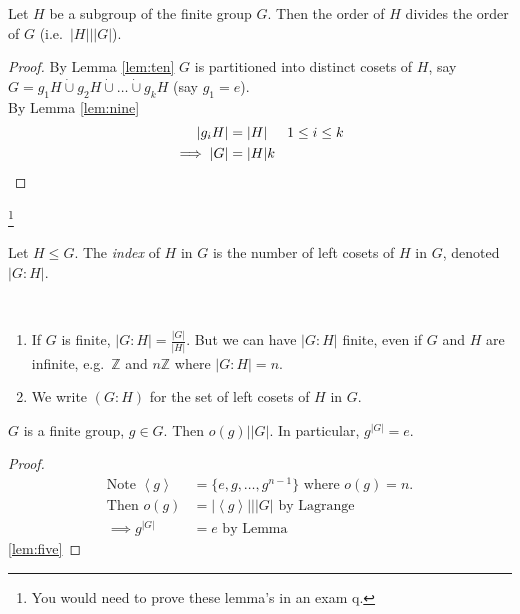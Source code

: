 \begin{theorem}
\protect\hypertarget{thm:three}{}\label{thm:three}Let \(H\) be a subgroup of the finite group \(G\).
Then the order of \(H\) divides the order of \(G\) (i.e.~\(|H| \bigg| |G|\)).
\end{theorem}

\begin{proof}
By Lemma \ref{lem:ten} \(G\) is partitioned into distinct cosets of \(H\), say \(G = g_1 H \dot{\cup} g_2 H \dot{\cup} \ldots \dot{\cup} g_k H\) (say \(g_1 = e\)).\\
By Lemma \ref{lem:nine}
\begin{align*}
    |g_i H| &= |H| \hspace{.5cm} 1 \leq i \leq k \\
    \implies |G| &= |H|k
\end{align*}
\end{proof}

\footnote{You would need to prove these lemma's in an exam q.}

\begin{definition}
\protect\hypertarget{def:fourteen}{}\label{def:fourteen}Let \(H \leq G\).
The \emph{index} of \(H\) in \(G\) is the number of left cosets of \(H\) in \(G\), denoted \(|G : H|\).
\end{definition}

\begin{remark}

~

\begin{enumerate}
\def\labelenumi{\roman{enumi}.}
\item
  If \(G\) is finite, \(|G : H| = \frac{|G|}{|H|}\).
  But we can have \(|G : H|\) finite, even if \(G\) and \(H\) are infinite, e.g.~\(\mathbb{Z}\) and \(n\mathbb{Z}\) where \(|G : H| = n\).
\item
  We write \((G : H)\) for the set of left cosets of \(H\) in \(G\).
\end{enumerate}

\end{remark}

\begin{corollary}
\protect\hypertarget{cor:two}{}\label{cor:two}\(G\) is a finite group, \(g \in G\).
Then \(o(g) \bigg| |G|\).
In particular, \(g^{|G|} = e\).
\end{corollary}

\begin{proof}
\begin{align*}
    \text{Note } \left\langle g\right\rangle &= \{ e, g, \ldots, g^{n-1} \} \text{ where } o(g) = n. \\
    \text{Then } o(g) &= | \left\langle g\right\rangle | \bigg| |G| \text{ by Lagrange} \\
    \implies g^{|G|} &= e \text{ by Lemma }
\end{align*} \ref{lem:five}
\end{proof}

